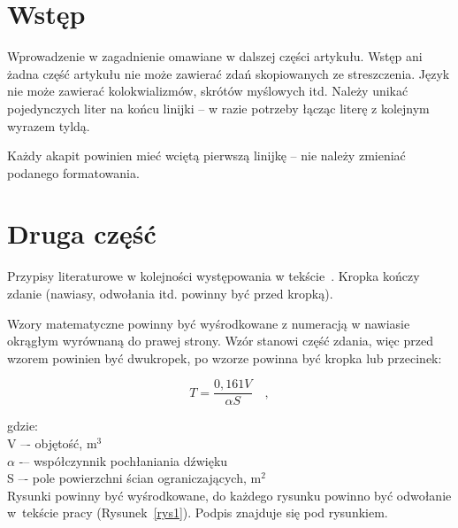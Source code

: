 \documentclass[12pt]{oska}
\affiliation{Afiliacja uczelni}
\begin{document}
\maketitles

\section{Wstęp}

Wprowadzenie w zagadnienie omawiane w dalszej części artykułu. Wstęp ani żadna część artykułu nie może zawierać zdań skopiowanych ze streszczenia. Język nie może zawierać kolokwializmów, skrótów myślowych itd. Należy unikać pojedynczych liter na końcu linijki -- w razie potrzeby łącząc literę z kolejnym wyrazem tyldą.

Każdy akapit powinien mieć wciętą pierwszą linijkę -- nie należy zmieniać podanego formatowania.

\section{Druga część}

Przypisy literaturowe w kolejności występowania w tekście~\cite{bib1}. Kropka kończy zdanie (nawiasy, odwołania itd. powinny być przed kropką).

Wzory matematyczne powinny być wyśrodkowane z numeracją w nawiasie okrągłym wyrównaną do prawej strony. Wzór stanowi część zdania, więc przed wzorem powinien być dwukropek, po wzorze powinna być kropka lub przecinek:

\begin{equation}
	T = \frac{0,161 V}{\alpha S} \quad, \label{wzor1}
\end{equation}


\noindent gdzie:\\
V –- objętość, m$^3$\\
$\alpha$ -– współczynnik pochłaniania dźwięku\\
S –- pole powierzchni ścian ograniczających, m$^2$\\

Rysunki powinny być wyśrodkowane, do każdego rysunku powinno być odwołanie w~tekście pracy (Rysunek~\ref{rys1}). Podpis znajduje się pod rysunkiem.
\end{document}

